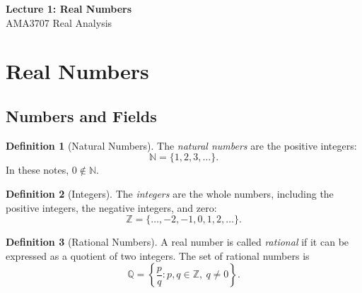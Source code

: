 \documentclass[12pt]{article}
\theoremstyle{definition}
\newtheorem{definition}{Definition}[subsection]
\begin{document}
\begin{center}
  {\LARGE\bfseries Lecture 1: Real Numbers}\\[0.25em]
  {\large AMA3707 Real Analysis}\\[0.15em]
\end{center}

\section{Real Numbers}
\subsection{Numbers and Fields}

\begin{definition}[Natural Numbers]
\label{def:natural-numbers}
The \emph{natural numbers} are the positive integers:
\[
  \mathbb{N}=\{1,2,3,\ldots\}.
\]
In these notes, \(0\notin\mathbb{N}\).
\end{definition}

\begin{definition}[Integers]
\label{def:integers}
The \emph{integers} are the whole numbers, including the positive integers,
the negative integers, and zero:
\[
  \mathbb{Z}=\{\ldots,-2,-1,0,1,2,\ldots\}.
\]
\end{definition}

\begin{definition}[Rational Numbers]
\label{def:rational-numbers}
A real number is called \emph{rational} if it can be expressed as a quotient
of two integers. The set of rational numbers is
\[
  \mathbb{Q}
  =\left\{\frac{p}{q}:p,q\in\mathbb{Z},\ q\neq0\right\}.
\]
\end{definition}
\end{document}
